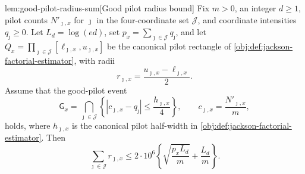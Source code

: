 \documentclass[11pt]{article}
\begin{document}
\begin{lemmav}{lem:good-pilot-radius-sum}[Good pilot radius bound]
Fix \(m>0\), an integer \(d\ge 1\), pilot counts \(N'_{\jmath,x}\) for \(\jmath\) in the four-coordinate set \(\mathcal J\), and coordinate intensities \(q_\jmath\ge 0\).  Let \(L_d=\log(ed)\), set \(p_x=\sum_{\jmath\in\mathcal J}q_\jmath\), and let \(Q_x=\prod_{\jmath\in\mathcal J}[\ell_{\jmath,x},u_{\jmath,x}]\) be the canonical pilot rectangle of \cref{obj:def:jackson-factorial-estimator}, with radii
\[
r_{\jmath,x}=\frac{u_{\jmath,x}-\ell_{\jmath,x}}{2}.
\]
Assume that the good-pilot event
\[
\mathsf G_x=\bigcap_{\jmath\in\mathcal J}
\left\{\left|c_{\jmath,x}-q_\jmath\right|\le \frac{h_{\jmath,x}}{4}\right\},
\qquad c_{\jmath,x}=\frac{N'_{\jmath,x}}{m},
\]
holds, where \(h_{\jmath,x}\) is the canonical pilot half-width in \cref{obj:def:jackson-factorial-estimator}.  Then
\[
\sum_{\jmath\in\mathcal J} r_{\jmath,x}
\le
2\cdot 10^6
\left\{
\sqrt{\frac{p_x L_d}{m}}+\frac{L_d}{m}
\right\}.
\]
\end{lemmav}
\end{document}
